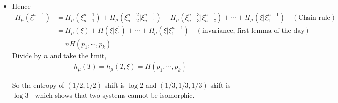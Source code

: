 \documentclass[10pt,a4paper]{report}
\newenvironment{subproof}
{\begin{changemargin}{0.5cm}{0.5cm}
	}%
	{\end{changemargin}
}
\begin{document}
\begin{itemize}
\begin{subproof}
\eop
\end{subproof}
\s

\item Hence
\begin{align*}
H_{\mu}(\xi_1^{n-1}) &= H_{\mu}(\xi_{n-1}^{n-1}) + H_{\mu}(\xi_{n-2}^{n-2} | \xi_{n-1}^{n-1}) + H_{\mu}(\xi_{n-3}^{n-3} | \xi_{n-2}^{n-1}) + \cdots + H_{\mu}(\xi | \xi^{n-1}_{1}) \quad (\text{Chain rule}) \\
&= H_{\mu}(\xi) + H(\xi |\xi_1^1) + \cdots + H_{\mu}(\xi | \xi_1^{n-1}) \quad (\text{invariance, first lemma of the day}) \\
&= nH(p_1, \cdots, p_k)
\end{align*}
Divide by $n$ and take the limit, 
\begin{align*}
h_{\mu}(T) = h_{\mu}(T,\xi) = H(p_1, \cdots, p_k)
\end{align*}

So the entropy of $(1/2,1/2)$ shift is $\log2$ and $(1/3,1/3,1/3)$ shift is $\log3$ - which shows that two systems cannot be isomorphic.
\end{itemize}
\end{document}
